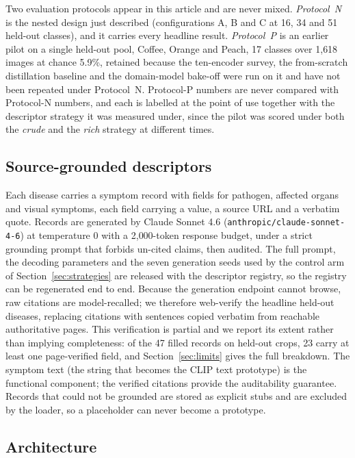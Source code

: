 \documentclass[a4paper,fleqn]{cas-dc}
\begin{document}
Two evaluation protocols appear in this article and are never mixed. \emph{Protocol~N} is the
nested design just described (configurations A, B and C at 16, 34 and 51 held-out classes),
and it carries every headline result. \emph{Protocol~P} is an earlier pilot on a single held-out
pool, Coffee, Orange and Peach, 17 classes over 1{,}618 images at chance 5.9\%, retained because
the ten-encoder survey, the from-scratch distillation baseline and the domain-model bake-off were
run on it and have not been repeated under Protocol~N. Protocol-P numbers are never compared with
Protocol-N numbers, and each is labelled at the point of use together with the descriptor strategy
it was measured under, since the pilot was scored under both the \emph{crude} and the \emph{rich}
strategy at different times.

\subsection{Source-grounded descriptors}
\label{sec:desc-gen}

Each disease carries a symptom record with fields for pathogen, affected organs and visual symptoms,
each field carrying a value, a source URL and a verbatim quote. Records are generated by Claude Sonnet 4.6 (\texttt{anthropic/claude-sonnet-4-6}) at temperature 0 with a 2{,}000-token response budget, under a strict grounding prompt that forbids un-cited claims, then audited. The full
prompt, the decoding parameters and the seven generation seeds used by the control arm of
Section~\ref{sec:strategies} are released with the descriptor registry, so the registry can be
regenerated end to end. Because the generation endpoint
cannot browse, raw citations are model-recalled; we therefore web-verify the headline held-out
diseases, replacing citations with sentences copied verbatim from reachable authoritative pages. This verification is partial and we report its extent rather than implying completeness: of the
47 filled records on held-out crops, 23 carry at least one page-verified field, and
Section~\ref{sec:limits} gives the full breakdown. The
symptom text (the string that becomes the CLIP text prototype) is the functional component; the
verified citations provide the auditability guarantee. Records that could not be grounded are stored as
explicit stubs and are excluded by the loader, so a placeholder can never become a prototype.

\subsection{Architecture}
\end{document}
